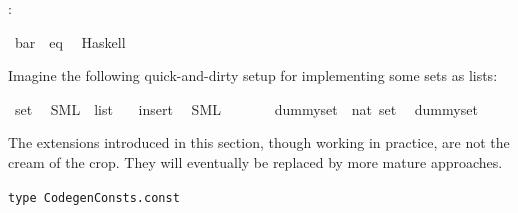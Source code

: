 \begin{isabellebody}
\begin{isamarkuptext}
    \isasymCODEINSTANCE:%
\end{isamarkuptext}%
\isamarkuptrue%
\isamarkupfalse%
\ bar\ {\isacharcolon}{\isacharcolon}\ eq\isanewline
\ \ {\isacharparenleft}Haskell\ {\isacharminus}{\isacharparenright}%
\isamarkuptrue%
%
\begin{isamarkuptext}%
Imagine the following quick-and-dirty setup for implementing
  some sets as lists:%
\end{isamarkuptext}%
\isamarkuptrue%
\isamarkupfalse%
\ set\isanewline
\ \ {\isacharparenleft}SML\ {\isachardoublequoteopen}{\isacharunderscore}\ list{\isachardoublequoteclose}{\isacharparenright}\isanewline
\isanewline
{}\isamarkupfalse%
\ {\isachardoublequoteopen}{\isacharbraceleft}{\isacharbraceright}{\isachardoublequoteclose}\ \ insert\isanewline
\ \ {\isacharparenleft}SML\ {\isachardoublequoteopen}{\isacharbang}{\isacharbrackleft}{\isacharbrackright}{\isachardoublequoteclose}\ \ \ {}\ {\isachardoublequoteopen}{\isacharcolon}{\isacharcolon}{\isachardoublequoteclose}{\isacharparenright}\isanewline
\isanewline
{}\isamarkupfalse%
\isanewline
\ \ dummy{\isacharunderscore}set\ {\isacharcolon}{\isacharcolon}\ {\isachardoublequoteopen}nat\ set{\isachardoublequoteclose}\isanewline
\ \ {\isachardoublequoteopen}dummy{\isacharunderscore}set\ {\isacharequal}\ {\isacharbraceleft}{}{\isacharcomma}\ {}{\isacharcomma}\ {}{\isacharbraceright}{\isachardoublequoteclose}%
\isamarkuptrue%
%
\begin{isamarkuptext}%
\begin{warn}
    The extensions introduced in this section, though working
    in practice, are not the cream of the crop.  They will
    eventually be replaced by more mature approaches.
  \end{warn}%
\end{isamarkuptext}%
\isamarkuptrue%
%
\isamarkuptrue%
%
\isamarkuptrue%
%
\isadelimmlref
%
\endisadelimmlref
%
\isatagmlref
%
\begin{isamarkuptext}%
\begin{mldecls}
  \verb|type CodegenConsts.const| \\

\end{mldecls}
\end{isamarkuptext}
\end{isabellebody}
